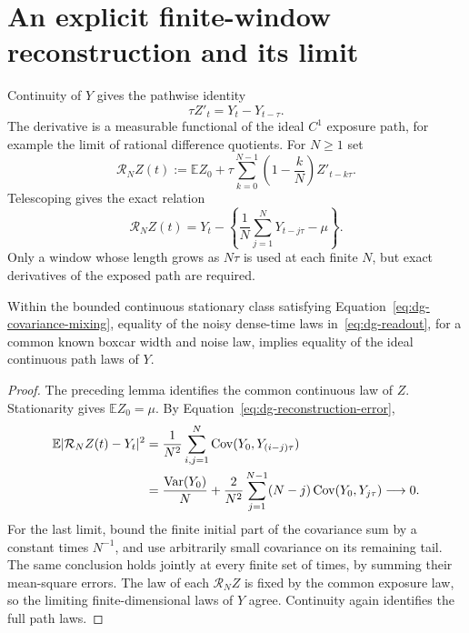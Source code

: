 \section{An explicit finite-window reconstruction and its limit}

Continuity of $Y$ gives the pathwise identity
\begin{equation}
 \tau Z'_t=Y_t-Y_{t-\tau}.
 \label{eq:dg-derivative}
\end{equation}
The derivative is a measurable functional of the ideal $C^1$ exposure path,
for example the limit of rational difference quotients. For $N\geq1$ set
\begin{equation}
 \mathcal R_N Z(t)
 :=\mathbb E Z_0+
 \tau\sum_{k=0}^{N-1}\left(1-\frac{k}{N}\right)Z'_{t-k\tau}.
 \label{eq:dg-triangular-reconstruction}
\end{equation}
Telescoping gives the exact relation
\begin{equation}
 \mathcal R_N Z(t)
 =Y_t-\left\{\frac1N\sum_{j=1}^NY_{t-j\tau}-\mu\right\}.
 \label{eq:dg-reconstruction-error}
\end{equation}
Only a window whose length grows as $N\tau$ is used at each finite $N$,
but exact derivatives of the exposed path are required.

\begin{theorem}
\label{thm:dg-injectivity}
Within the bounded continuous stationary class satisfying
Equation~\eqref{eq:dg-covariance-mixing}, equality of the noisy dense-time
laws in~\eqref{eq:dg-readout}, for a common known boxcar width and noise
law, implies equality of the ideal continuous path laws of $Y$.
\end{theorem}

\begin{proof}
The preceding lemma identifies the common continuous law of $Z$.
Stationarity gives $\mathbb E Z_0=\mu$. By
Equation~\eqref{eq:dg-reconstruction-error},
\begin{align}
 \mathbb E|\mathcal R_N Z(t)-Y_t|^2
 &=\frac1{N^2}\sum_{i,j=1}^N
          \operatorname{Cov}(Y_0,Y_{(i-j)\tau})\notag\\
 &=\frac{\operatorname{Var}(Y_0)}N
   +\frac2{N^2}\sum_{j=1}^{N-1}(N-j)
                \operatorname{Cov}(Y_0,Y_{j\tau})
 \longrightarrow0.
 \label{eq:dg-mean-square-recovery}
\end{align}
For the last limit, bound the finite initial part of the covariance sum by
a constant times $N^{-1}$, and use arbitrarily small covariance on its
remaining tail. The same conclusion holds jointly at every finite set of
times, by summing their mean-square errors. The law of each
$\mathcal R_N Z$ is fixed by the common exposure law, so the limiting
finite-dimensional laws of $Y$ agree. Continuity again identifies the full
path laws.
\end{proof}

